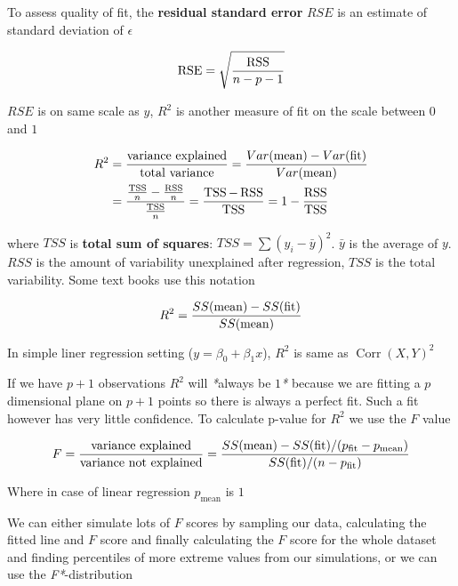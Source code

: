 To assess quality of fit, the \textbf{residual standard error} \(RSE\) is an estimate of standard deviation of \(\epsilon\)

\[\operatorname{RSE} = \sqrt{\operatorname{RSS} \over n - p - 1}\]

\(RSE\) is on same scale as \(y\), \(R^2\) is another measure of fit on the scale between \(0\) and \(1\)

\[
\begin{aligned}
R^2 &= {\operatorname{variance\ explained} \over \operatorname{total\ variance}} = {Var(\operatorname{mean}) - Var(\operatorname{fit}) \over Var(\operatorname{mean})}
\\
&= {{\operatorname{TSS} \over n} - {\operatorname{RSS} \over n} \over {\operatorname{TSS} \over n}} = {\operatorname{TSS} - \operatorname{RSS} \over \operatorname{TSS}} = 1 - {\operatorname{RSS} \over \operatorname{TSS}}
\end{aligned}
\]

where \(TSS\) is \textbf{total sum of squares}: \(TSS = \sum(y_i - \bar y)^2\). \(\bar y\) is the average of \(y\). \(RSS\) is the amount of variability unexplained after regression, \(TSS\) is the total variability. Some text books use this notation

\[R^2 = {SS(\operatorname{mean}) - SS(\operatorname{fit}) \over SS(\operatorname{mean})} \]

In simple liner regression setting (\(y = \beta _0 + \beta _1 x\)), \(R^2\) is same as \(\operatorname{Corr}(X, Y)^2\)

If we have \(p+1\) observations \(R^2\) will \textit{*}always be \(1\)\textit{*} because we are fitting a \(p\) dimensional plane on \(p+1\) points so there is always a perfect fit. Such a fit however has very little confidence. To calculate p-value for \(R^2\) we use the \(F\) value

\[F = {\operatorname{variance\ explained} \over \operatorname{variance\ not\ explained}} = {SS(\operatorname{mean}) - SS(\operatorname{fit}) / (p_{\operatorname{fit}} - p_{\operatorname{mean}}) \over SS(\operatorname{fit}) / (n - p_{\operatorname{fit}})}\]

Where in case of linear regression \(p_{\operatorname{mean}}\) is \(1\)

We can either simulate lots of \(F\) scores by sampling our data, calculating the fitted line and \(F\) score and finally calculating the \(F\) score for the whole dataset and finding percentiles of more extreme values from our simulations, or we can use the \textit{F*}-distribution

